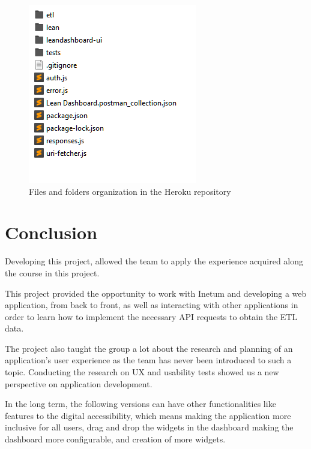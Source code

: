 \documentclass[a4paper,twoside,10pt]{report}
\begin{document}
\begin{figure}[h!]
\center
  \includegraphics[width=\textwidth]{deploymentFolder.png}
\caption{Files and folders organization in the Heroku repository}
\end{figure}



\chapter{Conclusion}

Developing this project, allowed the team to apply the experience acquired along the course in this project.

This project provided the opportunity to work with Inetum and developing a web application, from back to front, as well as interacting with other applications in order to learn how to implement the necessary API requests to obtain the ETL data.

The project also taught the group a lot about the research and planning of an application's user experience as the team has never been introduced to such a topic. Conducting the research on UX and usability tests showed us a new perspective on application development.

In the long term, the following versions can have other functionalities like features to the digital accessibility, which means making the application more inclusive for all users, drag and drop the widgets in the dashboard making the dashboard more configurable, and creation of more widgets.
\end{document}
